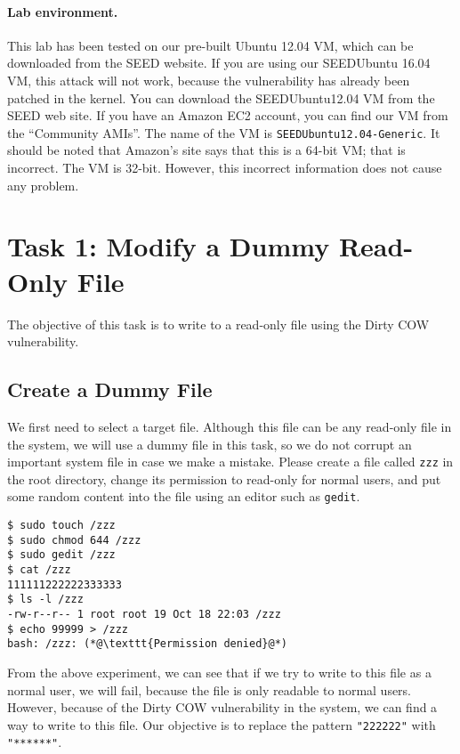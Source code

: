\paragraph{Lab environment.} This lab has been tested on our pre-built
Ubuntu 12.04 VM, which can be downloaded from the SEED website.
If you are using our SEEDUbuntu 16.04 VM, this attack will not work, because the 
vulnerability has already been patched in the kernel. 
You can download the SEEDUbuntu12.04 VM from the SEED web
site. If you have an Amazon EC2 account, you can find our VM from 
the ``Community AMIs''. The name of the VM is 
\texttt{SEEDUbuntu12.04-Generic}. It should be noted that
Amazon's site says that this is a 64-bit VM; that is incorrect. The VM is
32-bit. However, this incorrect information does not cause any problem.




\section{Task 1: Modify a Dummy Read-Only File}

The objective of this task is to write to a read-only file using the Dirty
COW vulnerability. 


\subsection{Create a Dummy File}

We first need to select a target file. Although this file can be any read-only
file in the system, we will use a dummy file in this task, so we do not corrupt 
an important system file in
case we make a mistake. Please create a file called \texttt{zzz} 
in the root directory, change its permission to read-only for normal users,
and put some random content into the file using an editor such as \texttt{gedit}. 

\begin{lstlisting}
$ sudo touch /zzz
$ sudo chmod 644 /zzz
$ sudo gedit /zzz
$ cat /zzz
111111222222333333
$ ls -l /zzz
-rw-r--r-- 1 root root 19 Oct 18 22:03 /zzz
$ echo 99999 > /zzz
bash: /zzz: (*@\texttt{Permission denied}@*)
\end{lstlisting}
 
From the above experiment, we can see that if we try to write to this file as a 
normal user, we will fail, because the file is only readable to normal users. 
However, because of the Dirty COW vulnerability in the system, we can
find a way to write to this file. Our objective is to replace the pattern
\texttt{"222222"} with \texttt{"******"}. 



